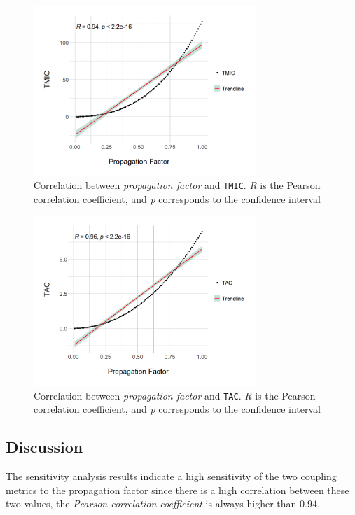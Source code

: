 \begin{figure}[ht!]
\begin{center}
\includegraphics[width=0.75\textwidth]{figures/results/Rplot_spoon-core_eclipse-osgi_TMIC.png}
\caption{Correlation between \textit{propagation factor} and \texttt{TMIC}. \textit{R} is the Pearson correlation coefficient, and \textit{p} corresponds to the confidence interval}
\label{fig:correlation-tmic}
\end{center}
\end{figure}

\begin{figure}[ht!]
\begin{center}
\includegraphics[width=0.75\textwidth]{figures/results/Rplot_spoon-core_eclipse-osgi_TAC.png}
\caption{Correlation between \textit{propagation factor} and \texttt{TAC}. \textit{R} is the Pearson correlation coefficient, and \textit{p} corresponds to the confidence interval}
\label{fig:correlation-tac}
\end{center}
\end{figure}

\subsection{Discussion}
The sensitivity analysis results indicate a high sensitivity of the two coupling metrics to the propagation factor since there is a high correlation between these two values, the \textit{Pearson correlation coefficient} is always higher than $0.94$.

